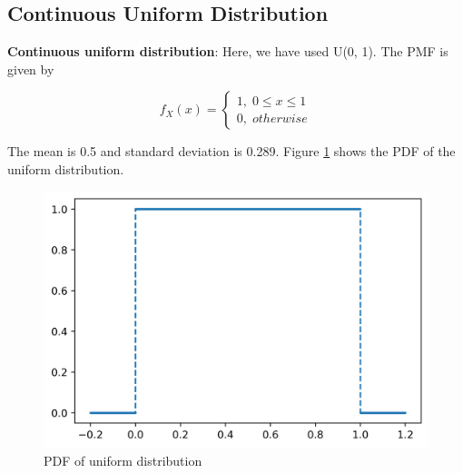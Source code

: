 \documentclass[10pt]{beamer}
\begin{document}
\begin{frame}{}
\subsection{Continuous Uniform Distribution}
 \textbf{Continuous uniform distribution}: Here, we have used U(0, 1). The PMF is given by 
 \begin{block}{}
 $$f_X(x) = \begin{cases}1,\; 0 \le x \le 1 \\ 0,\; otherwise\end{cases}$$ 
 \end{block}
    The mean is 0.5 and standard deviation is 0.289. Figure \ref{uni_pdf} shows the PDF of the uniform distribution.
\end{frame}
\begin{frame}{}
    \begin{figure}[H]
        \centering
        \includegraphics[scale=0.5]{images/uniform.png}
        \caption{PDF of uniform distribution}
        \label{uni_pdf}
    \end{figure}
\end{frame}
\end{document}

